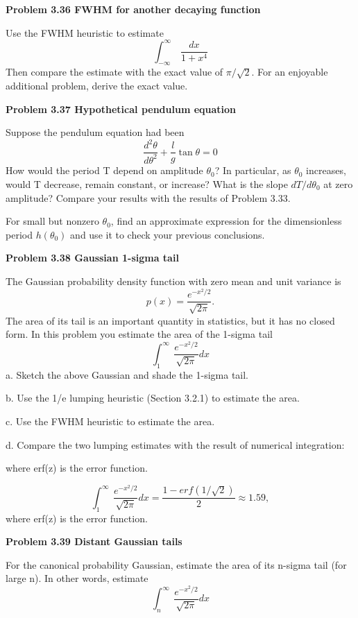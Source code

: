 \documentclass[a4paper, 11pt]{book}
\begin{document}
\colorbox{light-gray}{
\begin{minipage}{\textwidth}
\large\textbf{Problem 3.36 FWHM for another decaying function} 

Use the FWHM heuristic to estimate
\begin{equation}\int_{-\infty}^\infty\ \frac{dx}{1+x^4}\end{equation}
Then compare the estimate with the exact value of $\pi/\sqrt{2}$. For an enjoyable
additional problem, derive the exact value.

\large\textbf{Problem 3.37 Hypothetical pendulum equation} 

Suppose the pendulum equation had been
\begin{equation}\frac{d^2\theta}{d\theta^2} + \frac{l}{g}\tan \theta=0\end{equation}
How would the period T depend on amplitude $\theta_{0}$? In particular, as $\theta_{0}$ increases,
would T decrease, remain constant, or increase? What is the slope $dT/d\theta_{0}$ at
zero amplitude? Compare your results with the results of Problem 3.33.

For small but nonzero $\theta_{0}$, find an approximate expression for the dimensionless
period $h(\theta_{0})$ and use it to check your previous conclusions.

\large\textbf{Problem 3.38 Gaussian 1-sigma tail} 

The Gaussian probability density function with zero mean and unit variance is
\begin{equation}p(x)=\frac{e^{-x^2/2}}{\sqrt{2\pi}}.\end{equation}
The area of its tail is an important quantity in statistics, but it has no closed form.
In this problem you estimate the area of the 1-sigma tail
\begin{equation}\int_{1}^\infty\ \frac{e^{-x^2/2}}{\sqrt{2\pi}} dx\end{equation}
a. Sketch the above Gaussian and shade the 1-sigma tail.

b. Use the 1/e lumping heuristic (Section 3.2.1) to estimate the area.

c. Use the FWHM heuristic to estimate the area.

d. Compare the two lumping estimates with the result of numerical integration:

\normalsize{where erf(z) is the error function.}

\begin{equation}\int_{1}^\infty\ \frac{e^{-x^2/2}}{\sqrt{2\pi}}dx=\frac{1-erf(1/\sqrt{2})}{2}\approx 1.59,\end{equation}
where erf(z) is the error function.

\large\textbf{Problem 3.39 Distant Gaussian tails} 

For the canonical probability Gaussian, estimate the area of its n-sigma tail (for
large n). In other words, estimate
\begin{equation}\int_{n}^\infty\ \frac{e^{-x^2/2}}{\sqrt{2\pi}} dx\end{equation}
\end{minipage}
}

\newpage
\
\end{document}
